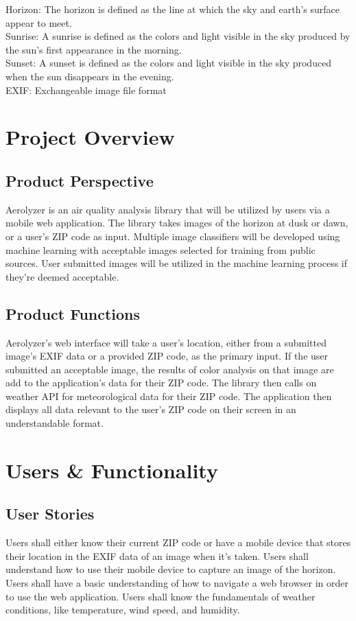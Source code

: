 \documentclass[journal,10pt,draftclsnofoot,onecolumn]{IEEEtran}
\begin{document}
\begin{singlespace}
Horizon: The horizon is defined as the line at which the sky and earth's surface appear to meet.\\

Sunrise: A sunrise is defined as the colors and light visible in the sky produced by the sun's first appearance in the morning.\\

Sunset: A sunset is defined as the colors and light visible in the sky produced when the sun disappears in the evening.\\

EXIF: Exchangeable image file format \\

\section{Project Overview}

\subsection{Product Perspective}
Aerolyzer is an air quality analysis library that will be utilized by users via a mobile web application.
The library takes images of the horizon at dusk or dawn, or a user's ZIP code as input.
Multiple image classifiers will be developed using machine learning with acceptable images selected for training from public sources.
User submitted images will be utilized in the machine learning process if they're deemed acceptable. 

\subsection{Product Functions}
Aerolyzer's web interface will take a user's location, either from a submitted image's EXIF data or a provided ZIP code, as the primary input.
If the user submitted an acceptable image, the results of color analysis on that image are add to the application's data for their ZIP code.
The library then calls on weather API for meteorological data for their ZIP code.
The application then displays all data relevant to the user's ZIP code on their screen in an understandable format.

\section{Users \& Functionality}
\subsection{User Stories}
Users shall either know their current ZIP code or have a mobile device that stores their location in the EXIF data of an image when it's taken.
Users shall understand how to use their mobile device to capture an image of the horizon.
Users shall have a basic understanding of how to navigate a web browser in order to use the web application.
Users shall know the fundamentals of weather conditions, like temperature, wind speed, and humidity.


\end{singlespace}
\end{document}
